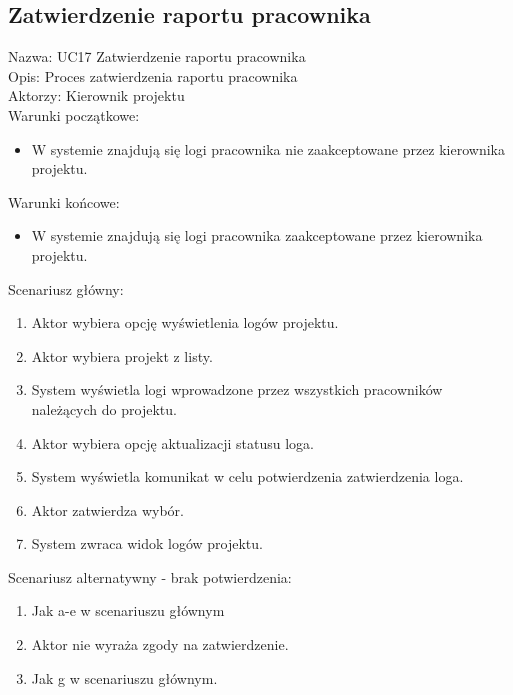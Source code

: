 \subsection{Zatwierdzenie raportu pracownika}
\begin{adjustwidth}{5em}{0pt}
Nazwa: UC17 Zatwierdzenie raportu pracownika \\
Opis: Proces zatwierdzenia raportu pracownika \\
Aktorzy: Kierownik projektu \\
Warunki początkowe:
\begin{itemize}
\item W systemie znajdują się logi pracownika nie zaakceptowane przez kierownika projektu.
\end{itemize}
Warunki końcowe:
\begin{itemize}
\item W systemie znajdują się logi pracownika zaakceptowane przez kierownika projektu.
\end{itemize}
Scenariusz główny:
\begin{enumerate}
\item Aktor wybiera opcję wyświetlenia logów projektu.
\item Aktor wybiera projekt z listy.
\item System wyświetla logi wprowadzone przez wszystkich pracowników należących do projektu.
\item Aktor wybiera opcję aktualizacji statusu loga.
\item System wyświetla komunikat w celu potwierdzenia zatwierdzenia loga.
\item Aktor zatwierdza wybór.
\item System zwraca widok logów projektu.
\end{enumerate}
Scenariusz alternatywny - brak potwierdzenia: 
\begin{enumerate}
\item Jak a-e w scenariuszu głównym
\item Aktor nie wyraża zgody na zatwierdzenie.
\item Jak g w scenariuszu głównym.
\end{enumerate}
\end{adjustwidth}

